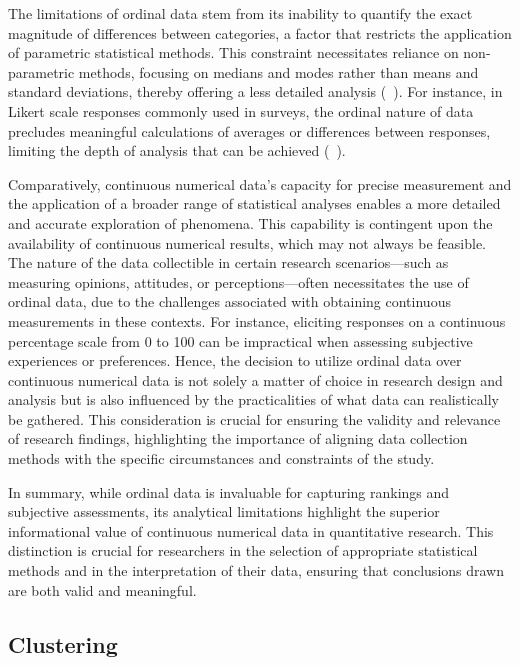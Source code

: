 \documentclass{article}
\begin{document}
The limitations of ordinal data stem from its inability to quantify the exact magnitude of differences between categories, a factor that restricts the application of parametric statistical methods. This constraint necessitates reliance on non-parametric methods, focusing on medians and modes rather than means and standard deviations, thereby offering a less detailed analysis (~\cite{Conover1999}). 
For instance, in Likert scale responses commonly used in surveys, the ordinal nature of data precludes meaningful calculations of averages or differences between responses, limiting the depth of analysis that can be achieved (~\cite{Likert1932}).

Comparatively, continuous numerical data's capacity for precise measurement and the application of a broader range of statistical analyses enables a more detailed and accurate exploration of phenomena. 
This capability is contingent upon the availability of continuous numerical results, which may not always be feasible. The nature of the data collectible in certain research scenarios—such as measuring opinions, attitudes, or perceptions—often necessitates the use of ordinal data, due to the challenges associated with obtaining continuous measurements in these contexts. For instance, eliciting responses on a continuous percentage scale from 0 to 100 can be impractical when assessing subjective experiences or preferences. Hence, the decision to utilize ordinal data over continuous numerical data is not solely a matter of choice in research design and analysis but is also influenced by the practicalities of what data can realistically be gathered. This consideration is crucial for ensuring the validity and relevance of research findings, highlighting the importance of aligning data collection methods with the specific circumstances and constraints of the study.

In summary, while ordinal data is invaluable for capturing rankings and subjective assessments, 
its analytical limitations highlight the superior informational value of continuous numerical data in quantitative research. 
This distinction is crucial for researchers in the selection of appropriate statistical methods and in the interpretation of their data, 
ensuring that conclusions drawn are both valid and meaningful.

\subsection{Clustering}
\end{document}
